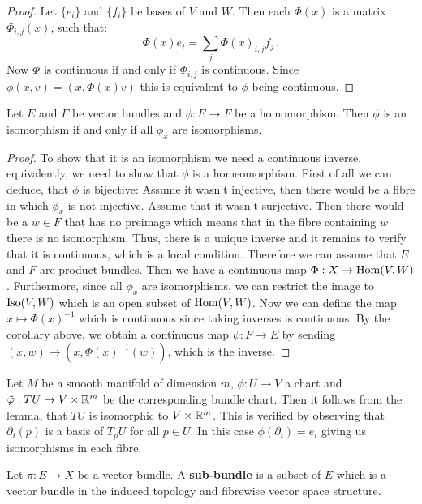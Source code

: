 \begin{proof}
	Let $\{e_i\}$ and $\{f_i\}$ be bases of $V$ and $W$. Then each $\Phi(x)$ is a matrix $\Phi_{i,j}(x)$, such that:
	\begin{equation*}
		\Phi(x)e_i=\sum_j\Phi(x)_{i,j}f_j\,.
	\end{equation*} Now $\Phi$ is continuous if and only if $\Phi_{i,j}$ is continuous. Since $\phi(x,v)=(x,\Phi(x)v)$ this is equivalent to $\phi$ being continuous. 
\end{proof}
\begin{lemma}\label{thm:vb-isomorphicVectorBundles}
	Let $E$ and $F$ be vector bundles and $\phi:E\to F$ be a homomorphism. Then $\phi$ is an isomorphism if and only if all $\phi_x$ are isomorphisms. 
\end{lemma}
\begin{proof}
	To show that it is an isomorphism we need a continuous inverse, equivalently, we need to show that $\phi$ is a homeomorphism. First of all we can deduce, that $\phi$ is bijective:
	Assume it wasn't injective, then there would be a fibre in which $\phi_x$ is not injective. Assume that it wasn't surjective. Then there would be a $w\in F$ that has no preimage which means that in the fibre containing $w$ there is no isomorphism. Thus, there is a unique inverse and it remains to verify that it is continuous, which is a local condition. Therefore we can assume that $E$ and $F$ are product bundles. Then we have a continuous map $\Phi:X\to \operatorname{\mathrm{Hom}}(V,W)$. Furthermore, since all $\phi_x$ are isomorphisms, we can restrict the image to $\operatorname{\mathrm{Iso}}(V,W)$ which is an open subset of $\operatorname{\mathrm{Hom}}(V,W)$. Now we can define the map $x\mapsto \Phi(x)^{-1}$ which is continuous since taking inverses is continuous. By the corollary above, we obtain a continuous map $\psi:F\to E$ by sending $(x,w)\mapsto (x,\Phi(x)^{-1}(w))$, which is the inverse. 
\end{proof}
\begin{example}
	Let $M$ be a smooth manifold of dimension $m$, $\phi:U\to V$ a chart and $\tilde{\varphi}:TU\to V\times \mathbb{R}^m$ be the corresponding bundle chart. Then it follows from the lemma, that $TU$ is isomorphic to $V\times \mathbb{R}^m$. This is verified by observing that $\partial_i(p)$ is a basis of $T_pU$ for all $p\in U$. In this case $\tilde{\phi}\left(\partial_i\right)=e_i$ giving us isomorphisms in each fibre.
\end{example}
\begin{definition}\label{def:vb-subBundles}
	Let $\pi:E\to X$ be a vector bundle. A \textbf{sub-bundle} is a subset of $E$ which is a vector bundle in the induced topology and fibrewise vector space structure.
\end{definition}

